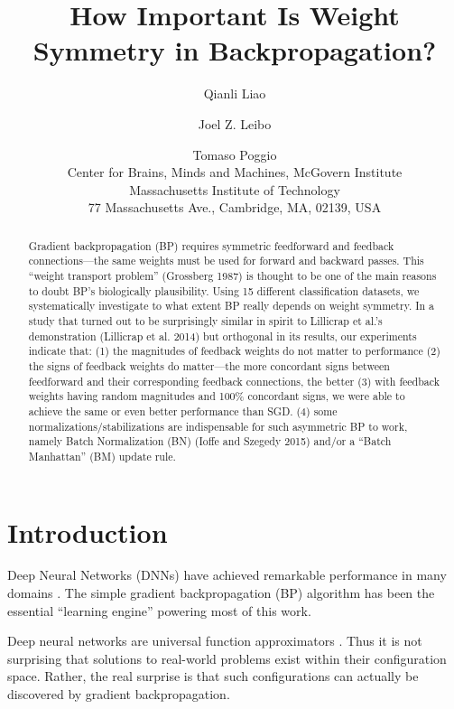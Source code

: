 \documentclass[letterpaper]{article}
\title{How Important Is Weight Symmetry in Backpropagation?}
\author{Qianli Liao \and Joel Z. Leibo \and Tomaso Poggio\\
Center for Brains, Minds and Machines, McGovern Institute \\
Massachusetts Institute of Technology \\
77 Massachusetts Ave., Cambridge, MA, 02139, USA
}
\begin{document}
       
\maketitle
\begin{abstract}
Gradient backpropagation (BP) requires symmetric feedforward and feedback connections---the same weights must be used for forward and backward passes. This ``weight transport problem'' (Grossberg 1987) is thought to be one of the main reasons to doubt BP's biologically plausibility. Using 15 different classification datasets, we systematically investigate to what extent BP really depends on weight symmetry. In a study that turned out to be surprisingly similar in spirit to Lillicrap et al.'s demonstration (Lillicrap et al. 2014) but orthogonal in its results, our experiments indicate that: (1) the magnitudes of feedback weights do not matter to performance (2) the signs of feedback weights do matter---the more concordant signs between feedforward and their corresponding feedback connections, the better (3) with feedback weights having random magnitudes and 100\% concordant signs, we were able to achieve the same or even better performance than SGD. (4) some normalizations/stabilizations are indispensable for such asymmetric BP to work, namely Batch Normalization (BN) (Ioffe and Szegedy 2015) and/or a ``Batch Manhattan'' (BM) update rule.
\end{abstract}



\newcommand{\specialcell}[2][c]{\begin{tabular}[#1]{@{}c@{}}#2\end{tabular}}

\section{Introduction}
Deep Neural Networks (DNNs) have achieved remarkable performance in many domains \cite{Krizhevsky2012,Abdel-Hamid2012,hinton2012deep,mikolov2013distributed,taigman2014deepface,graves2014neural}. The simple gradient backpropagation (BP) algorithm has been the essential ``learning engine'' powering most of this work. 

Deep neural networks are universal function approximators \cite{hornik1989multilayer}. Thus it is not surprising that solutions to real-world problems exist within their configuration space. Rather, the real surprise is that such configurations can actually be discovered by gradient backpropagation.
\end{document}
